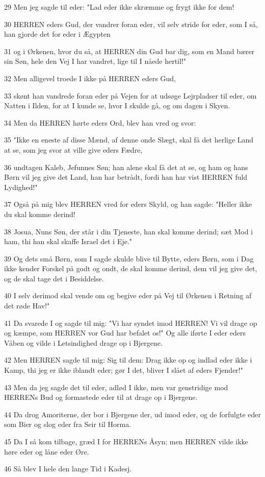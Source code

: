 \par 29 Men jeg sagde til eder: "Lad eder ikke skræmme og frygt ikke for dem!
\par 30 HERREN eders Gud, der vandrer foran eder, vil selv stride for eder, som I så, han gjorde det for eder i Ægypten
\par 31 og i Ørkenen, hvor du så, at HERREN din Gud bar dig, som en Mand bærer sin Søn, hele den Vej I har vandret, lige til I nåede hertil!"
\par 32 Men alligevel troede I ikke på HERREN eders Gud,
\par 33 skønt han vandrede foran eder på Vejen for at udsøge Lejrpladser til eder, om Natten i Ilden, for at I kunde se, hvor I skulde gå, og om dagen i Skyen.
\par 34 Men da HERREN hørte eders Ord, blev han vred og svor:
\par 35 "Ikke en eneste af disse Mænd, af denne onde Slægt, skal få det herlige Land at se, som jeg svor at ville give eders Fædre,
\par 36 undtagen Kaleb, Jefunnes Søn; han alene skal få det at se, og ham og hans Børn vil jeg give det Land, han har betrådt, fordi han har vist HERREN fuld Lydighed!"
\par 37 Også på mig blev HERREN vred for eders Skyld, og han sagde: "Heller ikke du skal komme derind!
\par 38 Josua, Nuns Søn, der står i din Tjeneste, han skal komme derind; sæt Mod i ham, thi han skal skaffe Israel det i Eje."
\par 39 Og dets små Børn, som I sagde skulde blive til Bytte, eders Børn, som i Dag ikke kender Forskel på godt og ondt, de skal komme derind, dem vil jeg give det, og de skal tage det i Besiddelse.
\par 40 I selv derimod skal vende om og begive eder på Vej til Ørkenen i Retning af det røde Hav!"
\par 41 Da svarede I og sagde til mig: "Vi har syndet imod HERREN! Vi vil drage op og kæmpe, som HERREN vor Gud har befalet os!" Og alle iførte I eder eders Våben og vilde i Letsindighed drage op i Bjergene.
\par 42 Men HERREN sagde til mig: Sig til dem: Drag ikke op og indlad eder ikke i Kamp, thi jeg er ikke iblandt eder; gør I det, bliver I slået af eders Fjender!"
\par 43 Men da jeg sagde det til eder, adlød I ikke, men var genstridige mod HERRENs Bud og formastede eder til at drage op i Bjergene.
\par 44 Da drog Amoriterne, der bor i Bjergene der, ud imod eder, og de forfulgte eder som Bier og slog eder fra Seir til Horma.
\par 45 Da I så kom tilbage, græd I for HERRENs Åsyn; men HERREN vilde ikke høre eder og låne eder Øre.
\par 46 Så blev I hele den lange Tid i Kadesj.

